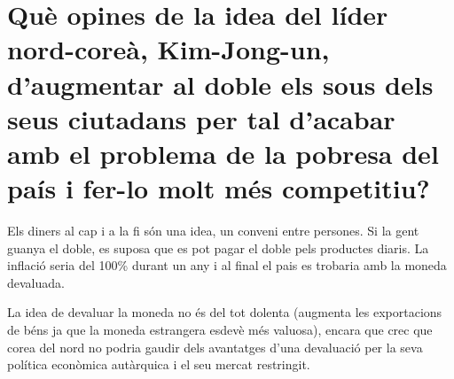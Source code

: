 \section {
  Què opines de la idea del líder nord-coreà, Kim-Jong-un, d’augmentar
  al doble els sous dels seus ciutadans per tal d’acabar amb 
  el problema de la pobresa
  del país i fer-lo molt més competitiu?
}

Els diners al cap i a la fi són una idea, un conveni entre persones. Si la
gent guanya el doble, es suposa que es pot pagar el doble pels productes
diaris. La inflació seria del 100\% durant un any i al final el pais es
trobaria amb la moneda devaluada. 

La idea de devaluar la moneda no és del tot dolenta
(augmenta les exportacions de béns ja que la moneda estrangera esdevè
més valuosa), encara que crec que
corea del nord no podria gaudir dels avantatges d'una devaluació per la
seva política econòmica autàrquica i el seu mercat restringit.

